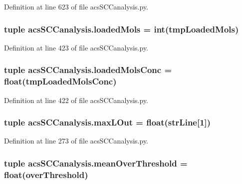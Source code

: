Definition at line 623 of file acs\+S\+C\+Canalysis.\+py.

\hypertarget{a00130_ab4566d46d368eb4f93ff6db5191648bd}{
\subsubsection[{loaded\+Mols}]{\setlength{\rightskip}{0pt plus 5cm}tuple acs\+S\+C\+Canalysis.\+loaded\+Mols = int(tmp\+Loaded\+Mols)}}\label{a00130_ab4566d46d368eb4f93ff6db5191648bd}


Definition at line 423 of file acs\+S\+C\+Canalysis.\+py.

\hypertarget{a00130_abe83f5e0ae3bd65da15a697a979aeea1}{
\subsubsection[{loaded\+Mols\+Conc}]{\setlength{\rightskip}{0pt plus 5cm}tuple acs\+S\+C\+Canalysis.\+loaded\+Mols\+Conc = float(tmp\+Loaded\+Mols\+Conc)}}\label{a00130_abe83f5e0ae3bd65da15a697a979aeea1}


Definition at line 422 of file acs\+S\+C\+Canalysis.\+py.

\hypertarget{a00130_a47da7b9153a0e4a33512f6d2675b8c1a}{
\subsubsection[{max\+L\+Out}]{\setlength{\rightskip}{0pt plus 5cm}tuple acs\+S\+C\+Canalysis.\+max\+L\+Out = float({\bf str\+Line}\mbox{[}1\mbox{]})}}\label{a00130_a47da7b9153a0e4a33512f6d2675b8c1a}


Definition at line 273 of file acs\+S\+C\+Canalysis.\+py.

\hypertarget{a00130_af10c3623be709892f4bdc4df5a3d52b0}{
\subsubsection[{mean\+Over\+Threshold}]{\setlength{\rightskip}{0pt plus 5cm}tuple acs\+S\+C\+Canalysis.\+mean\+Over\+Threshold = float({\bf over\+Threshold})}}\label{a00130_af10c3623be709892f4bdc4df5a3d52b0}


